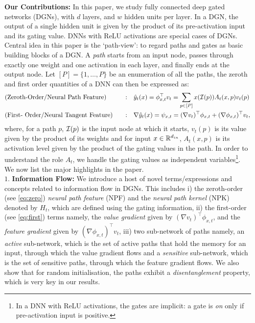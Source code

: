 \textbf{Our Contributions:} In this paper, we study fully connected deep gated networks (DGNs), with $d$ layers, and $w$ hidden units per layer. In a DGN,  the output of a single hidden unit is given by the product of its pre-activation input and its gating value. DNNs with ReLU activations are special cases of DGNs. Central idea in this paper is the `path-view': to regard paths and gates as basic building blocks of a DGN. A \emph{path} starts from an input node, passes through exactly one weight and one activation in each layer, and finally ends at the output node. Let $[P]=\{1,\ldots,P\}$ be an enumeration of all the paths, the zeroth and first order quantities of a DNN can then be expressed as:
\begin{align}
\label{eq:zero}&\text{(Zeroth-Order/Neural Path Feature)}&\quad:& \quad \hat{y}_t(x)={\phi^\top_{x,t}} v_t=\sum_{p\in [P]}x(\mathcal{I}(p))A_t(x,p)v_t(p)\\
\label{eq:first}&\text{(First- Order/Neural Tangent Feature)}&\quad:&\quad   \nabla \hat{y}_t(x)=\psi_{x,t}=(\nabla v_t )^\top \phi_{x,t} + (\nabla \phi_{x,t})^\top v_t,
\end{align}
where, for a path $p$, $\mathcal{I}(p)$ is the input node at which it starts, $v_t(p)$ is its value given by the product of its weights and for input $x\in\mathbb{R}^{d_{in}}$, $A_t(x,p)$ is its activation level given by the product of the gating values in the path. In order to understand the role $A_t$, we handle the gating values as independent variables\footnote{In a DNN with ReLU activations, the gates are implicit: a gate is \emph{on} only if pre-activation input is positive.}. We now list the major highlights in the paper.\hfill\\
$1.$ \textbf{Information Flow:} We introduce a host of novel terms/expressions and concepts related to information flow in DGNs. This includes i) the zeroth-order (see \eqref{eq:zero}) \emph{neural path feature} (NPF) and the \emph{neural path kernel} (NPK) denoted by $H_t$, which are defined using the gating information, ii) the first-order (see \eqref{eq:first}) terms namely, the \emph{value gradient} given by $(\nabla v_t )^\top \phi_{x,t}$, and the \emph{feature gradient} given by $(\nabla \phi_{x,t})^\top v_t$, iii)  two sub-network of paths namely, an \emph{active} sub-network, which is the set of active paths that hold the memory for an input, through which the value gradient flows and a \emph{sensitive} sub-network, which is the set of sensitive paths, through which the feature gradient flows. We also show that for random initialisation, the paths exhibit a \emph{disentanglement} property, which is very key in our results.\\
